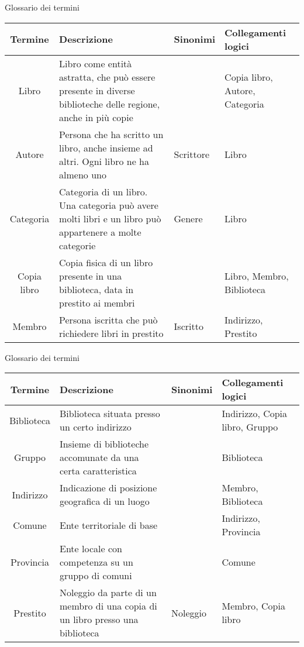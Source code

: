 \begin{frame}{Glossario dei termini}
    \scriptsize
    \def\arraystretch{1.4}
    \begin{center}
        \begin{tabular}{|c|m{5.5cm}|m{1.2cm}|m{1.5cm}|}
            \hline
            \textbf{Termine}    & \textbf{Descrizione} & \textbf{Sinonimi} & \textbf{Collegamenti logici} \\ \hline
            Libro               & Libro come entità astratta, che può essere presente in diverse biblioteche delle regione, anche in più copie &  & Copia libro, Autore, Categoria \\ \hline
            Autore              & Persona che ha scritto un libro, anche insieme ad altri. Ogni libro ne ha almeno uno & Scrittore & Libro \\ \hline
            Categoria           & Categoria di un libro. Una categoria può avere molti libri e un libro può appartenere a molte categorie & Genere       & Libro \\ \hline
            Copia libro         & Copia fisica di un libro presente in una biblioteca, data in prestito ai membri &  & Libro, Membro, Biblioteca  \\ \hline
            Membro              & Persona iscritta che può richiedere libri in prestito & Iscritto & Indirizzo, Prestito \\ \hline
        \end{tabular}
    \end{center}
\end{frame}

\begin{frame}{Glossario dei termini}
    \scriptsize
    \def\arraystretch{1.5}
    \begin{center}
        \begin{tabular}{|c|m{5.5cm}|m{1.2cm}|m{1.5cm}|}
            \hline
            \textbf{Termine}    & \textbf{Descrizione} & \textbf{Sinonimi} & \textbf{Collegamenti logici} \\ \hline
            Biblioteca          & Biblioteca situata presso un certo indirizzo &  & Indirizzo, Copia libro, Gruppo\\ \hline
            Gruppo              & Insieme di biblioteche accomunate da una certa caratteristica &  & Biblioteca \\ \hline
            Indirizzo           & Indicazione di posizione geografica di un luogo &  & Membro, Biblioteca \\ \hline
            Comune              & Ente territoriale di base & & Indirizzo, Provincia \\ \hline
            Provincia           & Ente locale con competenza su un gruppo di comuni & & Comune \\ \hline
            Prestito            & Noleggio da parte di un membro di una copia di un libro presso una biblioteca & Noleggio & Membro, Copia libro \\ \hline
        \end{tabular}
    \end{center}
\end{frame}

